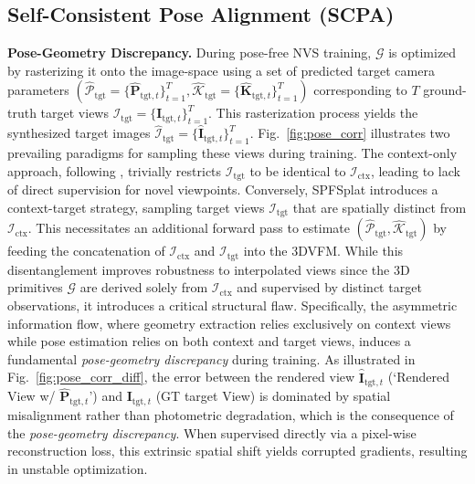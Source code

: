 \subsection{Self-Consistent Pose Alignment (SCPA)}
\label{sec:scpa}

\noindent \textbf{Pose-Geometry Discrepancy.} 
During pose-free NVS training, $\mathcal{G}$ is optimized by rasterizing it onto the image-space using a set of predicted target camera parameters $(\hat{\mathcal{P}}_\text{tgt} = \{\hat{\bm{P}}_{\text{tgt},t}\}_{t=1}^T, \hat{\mathcal{K}}_\text{tgt} = \{\hat{\bm{K}}_{\text{tgt},t}\}_{t=1}^T)$ corresponding to $T$ ground-truth target views $\mathcal{I}_\text{tgt} = \{\bm{I}_{\text{tgt},t}\}_{t=1}^T$. 
This rasterization process yields the synthesized target images $\hat{\mathcal{I}}_\text{tgt} = \{\hat{\bm{I}}_{\text{tgt},t}\}_{t=1}^T$. Fig.~\ref{fig:pose_corr} illustrates two prevailing paradigms for sampling these views during training. 
The context-only approach, following \cite{jiang2025anysplat}, trivially restricts $\mathcal{I}_\text{tgt}$ to be identical to $\mathcal{I}_\text{ctx}$, leading to lack of direct supervision for novel viewpoints. Conversely, SPFSplat \cite{huang2025no} introduces a context-target strategy, sampling target views $\mathcal{I}_\text{tgt}$ that are spatially distinct from $\mathcal{I}_\text{ctx}$. This necessitates an additional forward pass to estimate $(\hat{\mathcal{P}}_\text{tgt}, \hat{\mathcal{K}}_\text{tgt})$ by feeding the concatenation of $\mathcal{I}_\text{ctx}$ and $\mathcal{I}_\text{tgt}$ into the 3DVFM.  While this disentanglement improves robustness to interpolated views since the 3D primitives $\mathcal{G}$ are derived solely from $\mathcal{I}_\text{ctx}$ and supervised by distinct target observations, it introduces a critical structural flaw. Specifically, the asymmetric information flow, where geometry extraction relies exclusively on context views while pose estimation relies on both context and target views, induces a fundamental \textit{pose-geometry discrepancy} during training. As illustrated in Fig.~\ref{fig:pose_corr_diff}, the error between the rendered view $\hat{\bm{I}}_{\text{tgt},t}$ (`Rendered View w/ $\hat{\bm{P}}_{\text{tgt},t}$') and $\bm{I}_{\text{tgt},t}$ (GT target View) is dominated by spatial misalignment rather than photometric degradation, which is the consequence of the \textit{pose-geometry discrepancy}. When supervised directly via a pixel-wise reconstruction loss, this extrinsic spatial shift yields corrupted gradients, resulting in unstable optimization.


